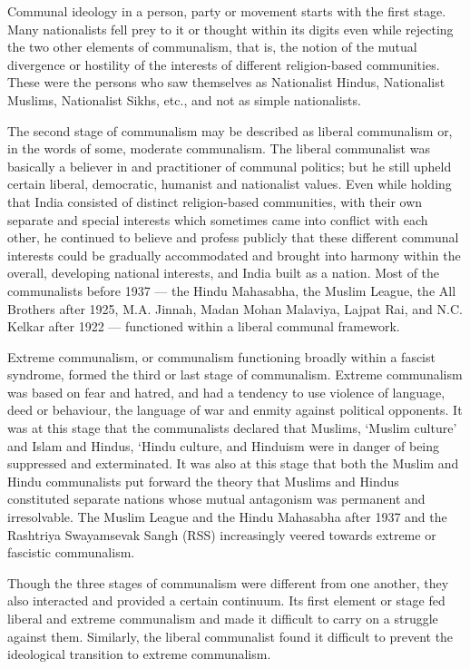 \begin{multicols}{2}
Communal ideology in a person, party or movement starts with the first stage. Many nationalists fell prey to it or thought within its digits even while rejecting the two other elements of communalism, that is, the notion of the mutual divergence or hostility of the interests of different religion-based communities. These were the persons who saw themselves as Nationalist Hindus, Nationalist Muslims, Nationalist Sikhs, etc., and not as simple nationalists.

The second stage of communalism may be described as liberal communalism or, in the words of some, moderate communalism. The liberal communalist was basically a believer in and practitioner of communal politics; but he still upheld certain liberal, democratic, humanist and nationalist values. Even while holding that India consisted of distinct religion-based communities, with their own separate and special interests which sometimes came into conflict with each other, he continued to believe and profess publicly that these different communal interests could be gradually accommodated and brought into harmony within the overall, developing national interests, and India built as a nation. Most of the communalists before 1937 --- the Hindu Mahasabha, the Muslim League, the All Brothers after 1925, M.A. Jinnah, Madan Mohan Malaviya, Lajpat Rai, and N.C. Kelkar after 1922 --- functioned within a liberal communal framework.

Extreme communalism, or communalism functioning broadly within a fascist syndrome, formed the third or last stage of communalism. Extreme communalism was based on fear and hatred, and had a tendency to use violence of language, deed or behaviour, the language of war and enmity against political opponents. It was at this stage that the communalists declared that Muslims, `Muslim culture' and Islam and Hindus, `Hindu culture, and Hinduism were in danger of being suppressed and exterminated. It was also at this stage that both the Muslim and Hindu communalists put forward the theory that Muslims and Hindus constituted separate nations whose mutual antagonism was permanent and irresolvable. The Muslim League and the Hindu Mahasabha after 1937 and the Rashtriya Swayamsevak Sangh (RSS) increasingly veered towards extreme or fascistic communalism.

Though the three stages of communalism were different from one another, they also interacted and provided a certain continuum. Its first element or stage fed liberal and extreme communalism and made it difficult to carry on a struggle against them. Similarly, the liberal communalist found it difficult to prevent the ideological transition to extreme communalism.


\end{multicols}
